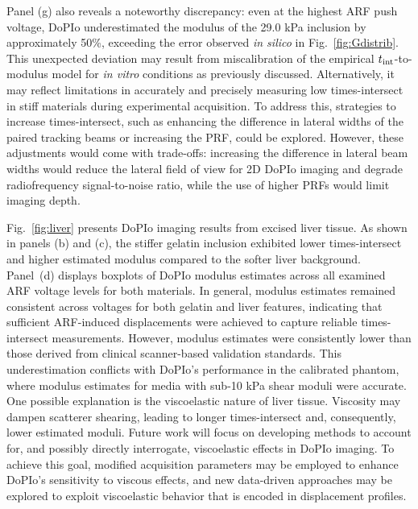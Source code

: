 Panel (g) also reveals a noteworthy discrepancy: even at the highest ARF push voltage, DoPIo underestimated the modulus of the 29.0 kPa inclusion by approximately 50\%, exceeding the error observed \emph{in silico} in Fig.~\ref{fig:Gdistrib}. This unexpected deviation may result from miscalibration of the empirical $t_{\textnormal{int}}$-to-modulus model for \emph{in vitro} conditions as previously discussed. Alternatively, it may reflect limitations in accurately and precisely measuring low times-intersect in stiff materials during experimental acquisition. To address this, strategies to increase times-intersect, such as enhancing the difference in lateral widths of the paired tracking beams or increasing the PRF, could be explored. However, these adjustments would come with trade-offs: increasing the difference in lateral beam widths would reduce the lateral field of view for 2D DoPIo imaging and degrade radiofrequency signal-to-noise ratio, while the use of higher PRFs would limit imaging depth.

Fig.~\ref{fig:liver} presents DoPIo imaging results from excised liver tissue. As shown in panels (b) and (c), the stiffer gelatin inclusion exhibited lower times-intersect and higher estimated modulus compared to the softer liver background. Panel~(d) displays boxplots of DoPIo modulus estimates across all examined ARF voltage levels for both materials. In general, modulus estimates remained consistent across voltages for both gelatin and liver features, indicating that sufficient ARF-induced displacements were achieved to capture reliable times-intersect measurements. However, modulus estimates were consistently lower than those derived from clinical scanner-based validation standards. This underestimation conflicts with DoPIo's performance in the calibrated phantom, where modulus estimates for media with sub-10 kPa shear moduli were accurate. One possible explanation is the viscoelastic nature of liver tissue. Viscosity may dampen scatterer shearing, leading to longer times-intersect and, consequently, lower estimated moduli. Future work will focus on developing methods to account for, and possibly directly interrogate, viscoelastic effects in DoPIo imaging. To achieve this goal, modified acquisition parameters may be employed to enhance DoPIo's sensitivity to viscous effects, and new data-driven approaches may be explored to exploit viscoelastic behavior that is encoded in displacement profiles.
